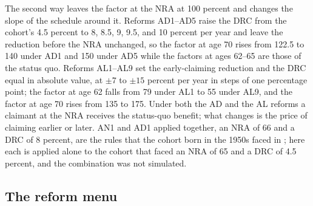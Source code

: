 The second way leaves the factor at the NRA at 100 percent and changes the slope of the schedule around it. Reforms AD1--AD5 raise the DRC from the cohort's 4.5 percent to 8, 8.5, 9, 9.5, and 10 percent per year and leave the reduction before the NRA unchanged, so the factor at age 70 rises from 122.5 to 140 under AD1 and 150 under AD5 while the factors at ages 62--65 are those of the status quo. %
Reforms AL1--AL9 set the early-claiming reduction and the DRC equal in absolute value, at $\pm 7$ to $\pm 15$ percent per year in steps of one percentage point; the factor at age 62 falls from 79 under AL1 to 55 under AL9, and the factor at age 70 rises from 135 to 175. %
Under both the AD and the AL reforms a claimant at the NRA receives the status-quo benefit; what changes is the price of claiming earlier or later. %
AN1 and AD1 applied together, an NRA of 66 and a DRC of 8 percent, are the rules that the cohort born in the 1950s faced in \citet{Yu2024}; here each is applied alone to the cohort that faced an NRA of 65 and a DRC of 4.5 percent, and the combination was not simulated. %

\subsection{The reform menu}\label{subsec:menu}

